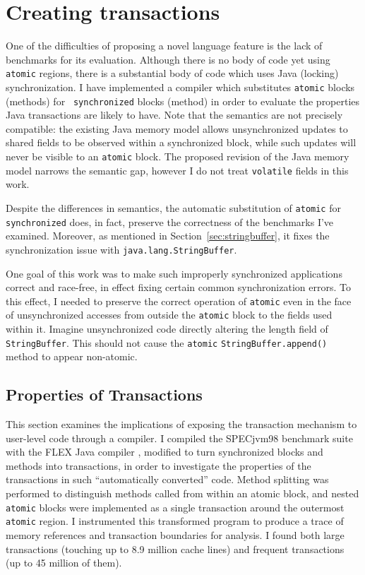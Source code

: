 \documentclass[12pt,oneside]{article}
\newcommand{\note}[1]{}%
\newcommand{\secput}[2]{\section{#2}\label{sec:#1}}
\newcommand{\subsecput}[2]{\subsection{#2}\label{sec:#1}}
\newcommand{\secref}[1]         {Section~\ref{sec:#1}}
\begin{document}
\secput{auto}{Creating transactions}
One of the difficulties of proposing a novel language feature is the
lack of benchmarks for its evaluation.  Although there is no body of
code yet using {\tt atomic} regions, there is a substantial body of
code which uses Java (locking) synchronization.  I have implemented a
compiler which substitutes {\tt atomic} blocks (methods) for {\tt
  synchronized} blocks (method) in order to evaluate the properties
Java transactions are likely to have.  Note that the semantics are not
precisely compatible: the existing Java memory model allows
unsynchronized updates to shared fields to be observed within a
synchronized block, while such updates will never be visible to an
{\tt atomic} block.  The proposed revision of the Java memory model
\cite{MansonPu02} narrows the semantic gap, however I do not treat
{\tt volatile} fields in this work.

Despite the differences in semantics, the automatic substitution of
{\tt atomic} for {\tt synchronized} does, in fact, preserve the
correctness of the benchmarks I've examined.  Moreover, as
mentioned in \secref{stringbuffer}, it
fixes the synchronization issue with {\tt java.lang.StringBuffer}.

One goal of this work was to make such improperly synchronized
applications correct and race-free, in effect fixing certain common
synchronization errors.  To this effect, I needed to preserve the
correct operation of {\tt atomic} even in the face of unsynchronized
accesses from outside the {\tt atomic} block to the fields used within
it.  Imagine unsynchronized code directly altering the length field of
{\tt StringBuffer}.  This should not cause the {\tt atomic}
{\tt StringBuffer.append()} method to appear non-atomic.
\note{Compare w/ Harris and Fraser?}

\subsecput{properties}{Properties of Transactions}
This section examines the implications of exposing the transaction
mechanism to user-level code through a compiler.
I compiled the SPECjvm98 benchmark suite with the FLEX Java compiler
\cite{Flex},
modified to turn synchronized blocks and methods into transactions,
in order to investigate the properties of the transactions in such
``automatically converted'' code.
Method splitting was performed to distinguish methods called from
within an atomic block, and nested
\texttt{atomic} blocks were implemented as a single
transaction around the outermost \texttt{atomic} region.  I
instrumented this transformed program to produce a trace of
memory references and transaction boundaries for analysis.
I found both large
transactions (touching up to 8.9 million cache lines) and frequent
transactions (up to 45 million of them).
\end{document}
